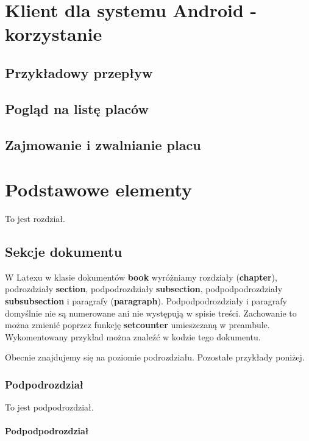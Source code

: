\documentclass[twoside,a4paper]{book}
\begin{document}
\chapter{Klient dla systemu Android - korzystanie}
\section{Przykładowy przepływ }
\section{Pogląd na listę placów}
\section{Zajmowanie i zwalnianie placu}








\chapter{Podstawowe elementy}

To jest rozdział.

\section{Sekcje dokumentu}

W Latexu w klasie dokumentów \textbf{book} wyróżniamy rozdziały (\textbf{chapter}), podrozdziały \textbf{section}, podpodrozdziały \textbf{subsection}, podpodpodrozdziały \textbf{subsubsection} i paragrafy (\textbf{paragraph}). Podpodpodrozdziały i paragrafy domyślnie nie są numerowane ani nie występują w spisie treści. Zachowanie to można zmienić poprzez funkcję \textbf{setcounter} umieszczaną w preambule. Wykomentowany przykład można znaleźć w kodzie tego dokumentu.

Obecnie znajdujemy się na poziomie podrozdziału. Pozostałe przykłady poniżej.

\subsection{Podpodrozdział}

To jest podpodrozdział.

\subsubsection{Podpodpodrozdział}
\end{document}
